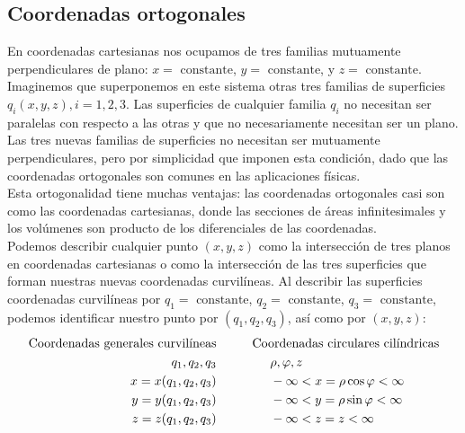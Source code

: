 \subsection{Coordenadas ortogonales}
En coordenadas cartesianas nos ocupamos de tres familias mutuamente perpendiculares de plano: $x = \mbox{ constante}$, $y = \mbox{ constante}$, y $z = \mbox{ constante}$. Imaginemos que superponemos en este sistema otras tres familias de superficies $q_{i} (x, y, z), i = 1,2,3$. Las superficies de cualquier familia $q_{i}$ no necesitan ser paralelas con respecto a las otras  y que no necesariamente necesitan ser un plano.
\\
Las tres nuevas familias de superficies no necesitan ser mutuamente perpendiculares, pero por simplicidad que imponen esta condición, dado que las coordenadas ortogonales son comunes en las aplicaciones físicas.
\\
Esta ortogonalidad tiene muchas ventajas: las coordenadas ortogonales casi son como las coordenadas cartesianas, donde las secciones de áreas infinitesimales y los volúmenes son producto de los diferenciales de las coordenadas.
\\
Podemos describir cualquier punto $(x, y, z)$ como la intersección de tres planos en coordenadas cartesianas o como la intersección de las tres superficies que forman nuestras nuevas coordenadas curvilíneas. Al describir las superficies coordenadas curvilíneas por $q_{1} = \mbox{ constante}$, $q_{2} = \mbox{ constante}$, $q_{3} = \mbox{ constante}$, podemos identificar nuestro punto por $(q_{1}, q_{2}, q_{3})$, así como por $(x, y, z)$:
\begin{eqnarray}
\begin{aligned}
\mbox{Coordenadas  generales curvilíneas} & \hspace{1.cm} \mbox{Coordenadas circulares cilíndricas} \\
q_{1}, q_{2}, q_{3} & \hspace{1.5cm} \rho, \varphi, z \\ 
x = x(q_{1},q_{2}, q_{3}) & \hspace{1.5cm} - \infty < x = \rho \cos \varphi < \infty \\ 
y = y(q_{1},q_{2}, q_{3}) & \hspace{1.5cm} - \infty < y = \rho \sin \varphi < \infty \\
z = z(q_{1},q_{2}, q_{3}) & \hspace{1.5cm} - \infty < z = z < \infty
\label{eq:ecuacion_02_01}
\end{aligned}
\end{eqnarray}

